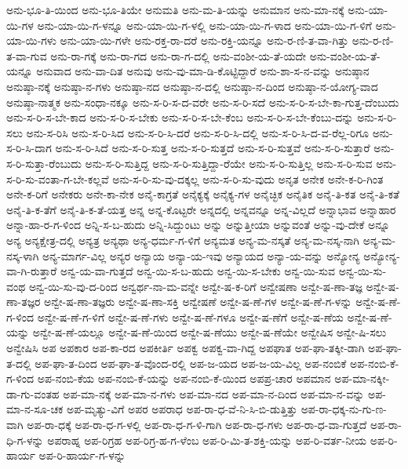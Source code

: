 {ಅನು-ಭೂ-ತಿ-ಯಿಂದ
ಅನು-ಭೂ-ತಿಯೇ
ಅನುಮತಿ
ಅನು-ಮ-ತಿ-ಯನ್ನು
ಅನುಮಾನ
ಅನು-ಮಾ-ನಕ್ಕೆ
ಅನು-ಯಾ-ಯಿ-ಗಳ
ಅನು-ಯಾ-ಯಿ-ಗ-ಳನ್ನೂ
ಅನು-ಯಾ-ಯಿ-ಗ-ಳಲ್ಲಿ
ಅನು-ಯಾ-ಯಿ-ಗ-ಳಾದ
ಅನು-ಯಾ-ಯಿ-ಗ-ಳಿಗೆ
ಅನು-ಯಾ-ಯಿ-ಗಳು
ಅನು-ಯಾ-ಯಿ-ಗಳೇ
ಅನು-ರಕ್ತ-ರಾ-ದರೆ
ಅನು-ರಕ್ತಿ-ಯನ್ನೂ
ಅನು-ರ-ಣಿ-ತ-ವಾ-ಗಿತ್ತು
ಅನು-ರ-ಣಿ-ತ-ವಾ-ಗುವ
ಅನು-ರಾ-ಗಕ್ಕೆ
ಅನು-ರಾ-ಗದ
ಅನು-ರಾ-ಗ-ದಲ್ಲಿ
ಅನು-ವಂಶೀ-ಯ-ತೆ-ಯದೇ
ಅನು-ವಂಶೀ-ಯ-ತೆ-ಯನ್ನೂ
ಅನುವಾದ
ಅನು-ವಾ-ದಿತ
ಅನುವು
ಅನು-ವು-ಮಾ-ಡಿ-ಕೊಟ್ಟಿದ್ದಾರೆ
ಅನು-ಶಾ-ಸ-ನ-ವನ್ನು
ಅನುಷ್ಠಾನ
ಅನುಷ್ಠಾ-ನಕ್ಕೆ
ಅನುಷ್ಠಾ-ನ-ಗಳು
ಅನುಷ್ಠಾ-ನದ
ಅನುಷ್ಠಾ-ನ-ದಲ್ಲಿ
ಅನುಷ್ಠಾ-ನ-ದಿಂದ
ಅನುಷ್ಠಾ-ನ-ಯೋಗ್ಯ-ವಾದ
ಅನುಷ್ಠಾ-ನಾತ್ಮಕ
ಅನು-ಸಂಧಾ-ನಕ್ಕೂ
ಅನು-ಸ-ರಿ-ಸ-ದ-ವರೇ
ಅನು-ಸ-ರಿ-ಸದೆ
ಅನು-ಸ-ರಿ-ಸ-ಬೇ-ಕಾ-ಗುತ್ತ-ದೆಂಬುದು
ಅನು-ಸ-ರಿ-ಸ-ಬೇ-ಕಾದ
ಅನು-ಸ-ರಿ-ಸ-ಬೇಕು
ಅನು-ಸ-ರಿ-ಸ-ಬೇ-ಕೆಂಬ
ಅನು-ಸ-ರಿ-ಸ-ಬೇ-ಕೆಂಬು-ದನ್ನು
ಅನು-ಸ-ರಿ-ಸಲು
ಅನು-ಸ-ರಿಸಿ
ಅನು-ಸ-ರಿ-ಸಿದ
ಅನು-ಸ-ರಿ-ಸಿ-ದರೆ
ಅನು-ಸ-ರಿ-ಸಿ-ದಲ್ಲಿ
ಅನು-ಸ-ರಿ-ಸಿ-ದ-ವ-ರೆಲ್ಲ-ರಿಗೂ
ಅನು-ಸ-ರಿ-ಸಿ-ದಾಗ
ಅನು-ಸ-ರಿ-ಸಿದೆ
ಅನು-ಸ-ರಿ-ಸುತ್ತ
ಅನು-ಸ-ರಿ-ಸುತ್ತದೆ
ಅನು-ಸ-ರಿ-ಸುತ್ತವೆ
ಅನು-ಸ-ರಿ-ಸುತ್ತಾರೆ
ಅನು-ಸ-ರಿ-ಸುತ್ತಾ-ರೆಂಬುದು
ಅನು-ಸ-ರಿ-ಸುತ್ತಿದ್ದ
ಅನು-ಸ-ರಿ-ಸುತ್ತಿದ್ದಾ-ರೆಯೇ
ಅನು-ಸ-ರಿ-ಸುತ್ತಿಲ್ಲ
ಅನು-ಸ-ರಿ-ಸುವ
ಅನು-ಸ-ರಿ-ಸು-ವಂತಾ-ಗ-ಬೇ-ಕಲ್ಲವೆ
ಅನು-ಸ-ರಿ-ಸು-ವು-ದಕ್ಕಲ್ಲ
ಅನು-ಸ-ರಿ-ಸು-ವುದು
ಅನೃತ
ಅನೇಕ
ಅನೇ-ಕ-ರಿ-ಗಿಂತ
ಅನೇ-ಕ-ರಿಗೆ
ಅನೇಕರು
ಅನೇ-ಕಾ-ನೇಕ
ಅನೈ-ಕಾಗ್ರತೆ
ಅನೈಕ್ಯಕ್ಕೆ
ಅನೈಕ್ಯ-ಗಳ
ಅನೈಚ್ಛಿಕ
ಅನೈತಿಕ
ಅನೈ-ತಿ-ಕತ
ಅನೈ-ತಿ-ಕತೆ
ಅನೈ-ತಿ-ಕ-ತೆಗೆ
ಅನೈ-ತಿ-ಕ-ತೆ-ಯತ್ತ
ಅನ್ನ
ಅನ್ನ-ಕೊಟ್ಟರೇ
ಅನ್ನದಲ್ಲಿ
ಅನ್ನವನ್ನೂ
ಅನ್ನ-ವಿಲ್ಲದೆ
ಅನ್ನಾಭಾವ
ಅನ್ನಾಹಾರ
ಅನ್ನಾ-ಹಾ-ರ-ಗ-ಳಿಂದ
ಅನ್ನಿ-ಸ-ಬ-ಹುದು
ಅನ್ನಿ-ಸಿದ್ದುಂಟು
ಅನ್ನು
ಅನ್ನುತ್ತೀಯಾ
ಅನ್ನುವಂತೆ
ಅನ್ನು-ವು-ದೇಕೆ
ಅನ್ನೂ
ಅನ್ಯ
ಅನ್ಯಕ್ಷೇತ್ರ-ದಲ್ಲಿ
ಅನ್ಯತ್ರ
ಅನ್ಯಥಾ
ಅನ್ಯ-ಧರ್ಮ-ಗ-ಳಿಗೆ
ಅನ್ಯಮತ
ಅನ್ಯ-ಮ-ನಸ್ಕತೆ
ಅನ್ಯ-ಮ-ನಸ್ಕ-ನಾಗಿ
ಅನ್ಯ-ಮ-ನಸ್ಕ-ಳಾಗಿ
ಅನ್ಯ-ಮಾರ್ಗ-ವಿಲ್ಲ
ಅನ್ಯರ
ಅನ್ಯಾಯ
ಅನ್ಯಾ-ಯ-ಇವು
ಅನ್ಯಾಯದ
ಅನ್ಯಾ-ಯ-ವನ್ನು
ಅನ್ಯೋನ್ಯ
ಅನ್ಯೋನ್ಯ-ವಾ-ಗಿ-ರುತ್ತಾರೆ
ಅನ್ವ-ಯ-ವಾ-ಗುತ್ತದೆ
ಅನ್ವ-ಯಿ-ಸ-ಬ-ಹುದು
ಅನ್ವ-ಯಿ-ಸ-ಬೇಕು
ಅನ್ವ-ಯಿ-ಸುವ
ಅನ್ವ-ಯಿ-ಸು-ವಂಥ
ಅನ್ವ-ಯಿ-ಸು-ವು-ದ-ರಿಂದ
ಅನ್ವರ್ಥ-ನಾ-ಮ-ವನ್ನೇ
ಅನ್ವೇ-ಷ-ಕ-ರಿಗೆ
ಅನ್ವೇಷಣಾ
ಅನ್ವೇ-ಷ-ಣಾ-ತಜ್ಞ
ಅನ್ವೇ-ಷ-ಣಾ-ತಜ್ಞರ
ಅನ್ವೇ-ಷ-ಣಾ-ತಜ್ಞರು
ಅನ್ವೇ-ಷ-ಣಾ-ಸಕ್ತಿ
ಅನ್ವೇಷಣೆ
ಅನ್ವೇ-ಷ-ಣೆ-ಗಳ
ಅನ್ವೇ-ಷ-ಣೆ-ಗ-ಳನ್ನು
ಅನ್ವೇ-ಷ-ಣೆ-ಗ-ಳಿಂದ
ಅನ್ವೇ-ಷ-ಣೆ-ಗ-ಳಿಗೆ
ಅನ್ವೇ-ಷ-ಣೆ-ಗಳು
ಅನ್ವೇ-ಷ-ಣೆ-ಗಳೂ
ಅನ್ವೇ-ಷ-ಣೆಗೆ
ಅನ್ವೇ-ಷ-ಣೆಯ
ಅನ್ವೇ-ಷ-ಣೆ-ಯನ್ನು
ಅನ್ವೇ-ಷ-ಣೆ-ಯಲ್ಲೂ
ಅನ್ವೇ-ಷ-ಣೆ-ಯಿಂದ
ಅನ್ವೇ-ಷ-ಣೆಯು
ಅನ್ವೇ-ಷ-ಣೆಯೇ
ಅನ್ವೇಷಿಸ
ಅನ್ವೇ-ಷಿ-ಸಲು
ಅನ್ವೇಷಿಸಿ
ಅಪ
ಅಪಕಾರ
ಅಪ-ಕಾ-ರದ
ಅಪಕೀರ್ತಿ
ಅಪಕ್ವ
ಅಪಕ್ವ-ವಾ-ಗಿದ್ದ
ಅಪಘಾತ
ಅಪ-ಘಾ-ತಕ್ಕೀ-ಡಾಗಿ
ಅಪ-ಘಾ-ತ-ದಲ್ಲಿ
ಅಪ-ಘಾ-ತ-ದಿಂದ
ಅಪ-ಘಾ-ತ-ವೊಂದ-ರಲ್ಲಿ
ಅಪ-ಜ-ಯದ
ಅಪ-ಜ-ಯ-ವಿಲ್ಲ
ಅಪ-ನಂಬಿಕೆ
ಅಪ-ನಂಬಿ-ಕೆ-ಗ-ಳಿಂದ
ಅಪ-ನಂಬಿ-ಕೆಯ
ಅಪ-ನಂಬಿ-ಕೆ-ಯನ್ನು
ಅಪ-ನಂಬಿ-ಕೆ-ಯಿಂದ
ಅಪಪ್ರ-ಚಾರ
ಅಪಮಾನ
ಅಪ-ಮಾ-ನಕ್ಕೀ-ಡಾ-ಗು-ವಂತಹ
ಅಪ-ಮಾ-ನಕ್ಕೆ
ಅಪ-ಮಾ-ನ-ಗಳು
ಅಪ-ಮಾ-ನದ
ಅಪ-ಮಾ-ನ-ದಿಂದ
ಅಪ-ಮಾ-ನ-ವನ್ನು
ಅಪ-ಮಾ-ನ-ಸೂ-ಚಕ
ಅಪ-ಮೃತ್ಯು-ವಿಗೆ
ಅಪರ
ಅಪರಾಧ
ಅಪ-ರಾ-ಧ-ವೆ-ನಿ-ಸಿ-ಬಿ-ಡುತ್ತಿತ್ತು
ಅಪ-ರಾ-ಧಕ್ಕ-ನು-ಗು-ಣ-ವಾಗಿ
ಅಪ-ರಾ-ಧಕ್ಕೆ
ಅಪ-ರಾ-ಧ-ಗ-ಳಲ್ಲಿ
ಅಪ-ರಾ-ಧ-ಗ-ಳಿ-ಗಾಗಿ
ಅಪ-ರಾ-ಧ-ಗಳು
ಅಪ-ರಾ-ಧ-ವಾ-ಗುತ್ತದೆ
ಅಪ-ರಾ-ಧಿ-ಗ-ಳನ್ನು
ಅಪರಾಹ್ನ
ಅಪ-ರಿಗ್ರಹ
ಅಪ-ರಿಗ್ರ-ಹ-ಗ-ಳೆಂಬ
ಅಪ-ರಿ-ಮಿ-ತ-ಶಕ್ತಿ-ಯನ್ನು
ಅಪ-ರಿ-ವರ್ತ-ನೀಯ
ಅಪ-ರಿ-ಹಾರ್ಯ
ಅಪ-ರಿ-ಹಾರ್ಯ-ಗ-ಳನ್ನು
}
